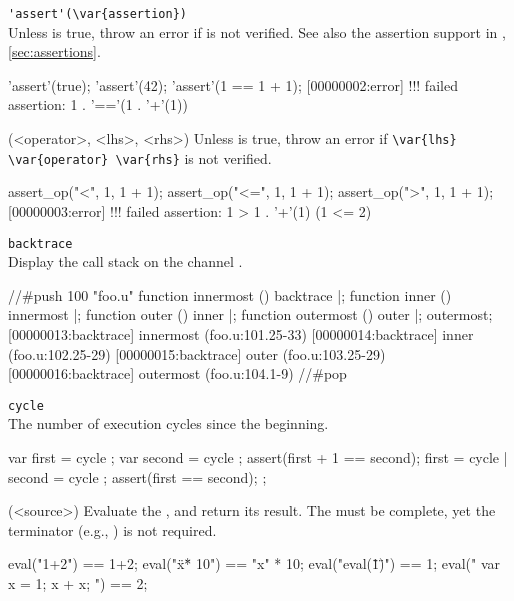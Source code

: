 \begin{urbiscriptapi}
\item \lstinline|'assert'(\var{assertion})|\\
  Unless  is true, throw an error if
   is not verified.  See also the assertion support in
  \us, \autoref{sec:assertions}.
\begin{urbiscript}
'assert'(true);
'assert'(42);
'assert'(1 == 1 + 1);
[00000002:error] !!! failed assertion: 1 . '=='(1 . '+'(1))
\end{urbiscript}

\item[assert_op](<operator>, <lhs>, <rhs>)%
  Unless  is true, throw an error if
  \lstinline|\var{lhs} \var{operator} \var{rhs}| is not verified.
\begin{urbiscript}
assert_op("<",  1, 1 + 1);
assert_op("<=", 1, 1 + 1);
assert_op(">",  1, 1 + 1);
[00000003:error] !!! failed assertion: 1 > 1 . '+'(1) (1 <= 2)
\end{urbiscript}

\item \lstinline|backtrace|\\
  Display the call stack on the channel . \experimental
\begin{urbiscript}
//#push 100 "foo.u"
function innermost () { backtrace }|;
function inner ()     { innermost }|;
function outer ()     { inner }|;
function outermost () { outer }|;
outermost;
[00000013:backtrace] innermost (foo.u:101.25-33)
[00000014:backtrace] inner (foo.u:102.25-29)
[00000015:backtrace] outer (foo.u:103.25-29)
[00000016:backtrace] outermost (foo.u:104.1-9)
//#pop
\end{urbiscript}

\item \lstinline|cycle|\\
  The number of execution cycles since the beginning. \experimental
\begin{urbiscript}
{
  var first = cycle ; var second = cycle ;
  assert(first + 1 == second);
  first = cycle | second = cycle ;
  assert(first == second);
};
\end{urbiscript}

\item[eval](<source>)%
  Evaluate the \us {}, and return its result.  The
   must be complete, yet the terminator (e.g., \samp{;})
  is not required.
\begin{urbiassert}
eval("1+2") == 1+2;
eval("\"x\" * 10") == "x" * 10;
eval("eval(\"1\")") ==  1;
eval("{ var x = 1; x + x; }") ==  2;
\end{urbiassert}


\end{urbiscriptapi}

